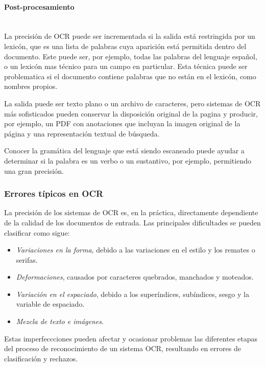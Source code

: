 		\paragraph{Post-procesamiento} ~\\
		
		La precisión de OCR puede ser incrementada si la salida está restringida por un lexicón, que es una lista de palabras cuya aparición está permitida dentro del documento. Este puede ser, por ejemplo, todas las palabras del lenguaje español, o un lexicón mas técnico para un campo en particular. Esta técnica puede ser problematica si el documento contiene palabras que no están en el lexicón, como nombres propios.
		
		La salida puede ser texto plano o un archivo de caracteres, pero sistemas de OCR más sofisticados pueden conservar la disposición original de la pagina y producir, por ejemplo, un PDF con anotaciones que incluyan la imagen original de la página y una representación textual de búsqueda.
		
		Conocer la gramática del lenguaje que está siendo escaneado puede ayudar a determinar si la palabra es un verbo o un sustantivo, por ejemplo, permitiendo una gran precisión.
		
	\subsubsection{Errores típicos en OCR}
	
		La precisión de los sistemas de OCR es, en la práctica, directamente dependiente de la calidad de los documentos de entrada. Las principales dificultades se pueden clasificar como sigue:
		\begin{itemize}
			\item \textit{Variaciones en la forma}, debido a las variaciones en el estilo y los remates o serifas.
			\item \textit{Deformaciones}, causados por caracteres quebrados, manchados y moteados.
			\item \textit{Variación en el espaciado}, debido a los superíndices, subíndices, sesgo y la variable de espaciado.
			\item \textit{Mezcla de texto e imágenes}.
		\end{itemize}
		Estas imperfeccciones pueden afectar y ocasionar problemas las diferentes etapas del proceso de reconocimiento de un sistema OCR, resultando en errores de clasificación y rechazos.	
	
		
